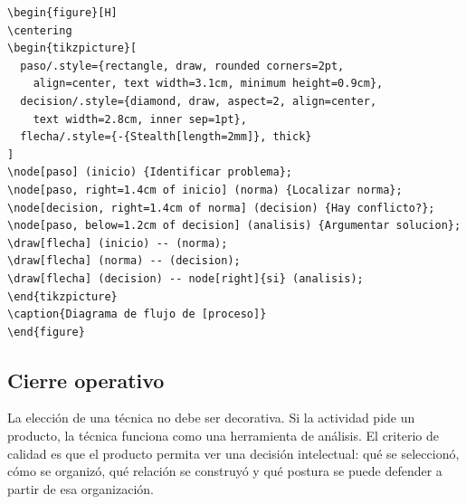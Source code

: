 \begin{verbatim}
\begin{figure}[H]
\centering
\begin{tikzpicture}[
  paso/.style={rectangle, draw, rounded corners=2pt,
    align=center, text width=3.1cm, minimum height=0.9cm},
  decision/.style={diamond, draw, aspect=2, align=center,
    text width=2.8cm, inner sep=1pt},
  flecha/.style={-{Stealth[length=2mm]}, thick}
]
\node[paso] (inicio) {Identificar problema};
\node[paso, right=1.4cm of inicio] (norma) {Localizar norma};
\node[decision, right=1.4cm of norma] (decision) {Hay conflicto?};
\node[paso, below=1.2cm of decision] (analisis) {Argumentar solucion};
\draw[flecha] (inicio) -- (norma);
\draw[flecha] (norma) -- (decision);
\draw[flecha] (decision) -- node[right]{si} (analisis);
\end{tikzpicture}
\caption{Diagrama de flujo de [proceso]}
\end{figure}
\end{verbatim}

\subsection{Cierre operativo}

La elección de una técnica no debe ser decorativa. Si la actividad pide un producto, la técnica funciona como una herramienta de análisis. El criterio de calidad es que el producto permita ver una decisión intelectual: qué se seleccionó, cómo se organizó, qué relación se construyó y qué postura se puede defender a partir de esa organización.
